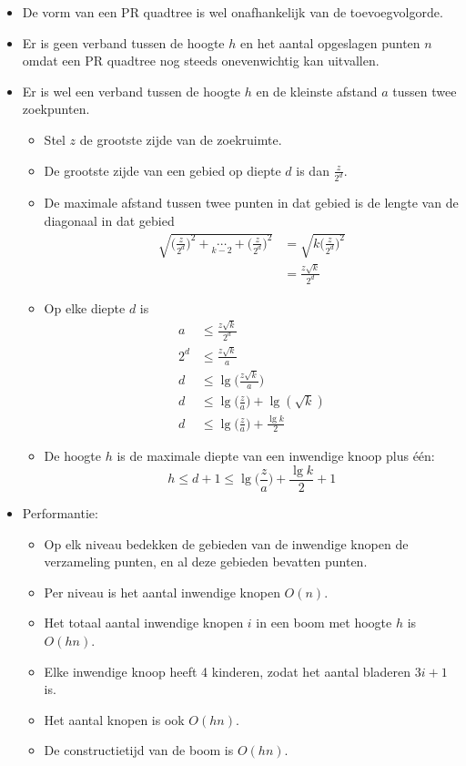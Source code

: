 \begin{itemize}
\begin{itemize}
    \end{itemize}
    \item De vorm van een PR quadtree is wel onafhankelijk van de toevoegvolgorde.
    \item Er is geen verband tussen de hoogte $h$ en het aantal opgeslagen punten $n$ omdat een PR quadtree nog steeds onevenwichtig kan uitvallen.
    \item Er is wel een verband tussen de hoogte $h$ en de kleinste afstand $a$ tussen twee zoekpunten.
    \begin{itemize}
        \item Stel $z$ de grootste zijde van de zoekruimte.
        \item De grootste zijde van een gebied op diepte $d$ is dan $\frac{z}{2^d}$. 
        \item De maximale afstand tussen twee punten in dat gebied is de lengte van de diagonaal in dat gebied
        \begin{align*}
            \sqrt{\bigg(\frac{z}{2^d}\bigg)^2 + \underset{k - 2}{\cdots} + \bigg(\frac{z}{2^d}\bigg)^2}  &= \sqrt{k\bigg(\frac{z}{2^d}\bigg)^2} \\
                &= \frac{z\sqrt{k}}{2^d}
        \end{align*} 
        \item Op elke diepte $d$ is 
        \begin{align*}
            a   &\leq \frac{z\sqrt{k}}{2^d} \\
            2^d &\leq \frac{z\sqrt{k}}{a} \\
            d &\leq \lg\bigg(\frac{z\sqrt{k}}{a}\bigg) \\
            d &\leq \lg\bigg(\frac{z}{a}\bigg) + \lg(\sqrt{k})\\
            d &\leq \lg\bigg(\frac{z}{a}\bigg) + \frac{\lg k}{2}
        \end{align*}
        \item De hoogte $h$ is de maximale diepte van een inwendige knoop plus één:
        $$h \leq d + 1\leq  \lg\bigg(\frac{z}{a}\bigg) + \frac{\lg k}{2} + 1$$
    \end{itemize}
    \item Performantie:
    \begin{itemize}
        \item Op elk niveau bedekken de gebieden van de inwendige knopen de verzameling punten, en al deze gebieden bevatten punten.
        \item Per niveau is het aantal inwendige knopen $O(n)$.
        \item Het totaal aantal inwendige knopen $i$ in een boom met hoogte $h$ is $O(hn)$.
        \item Elke inwendige knoop heeft 4 kinderen, zodat het aantal bladeren $3i + 1$ is.
        \item Het aantal knopen is ook $O(hn)$.
        \item De constructietijd van de boom is $O(hn)$.
    \end{itemize}
\end{itemize}


